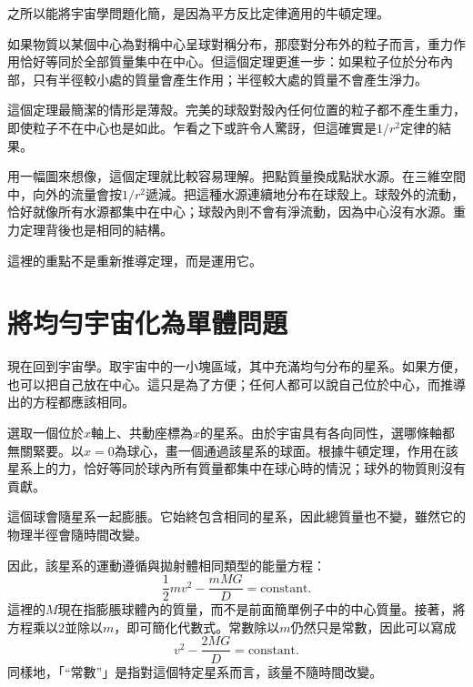 之所以能將宇宙學問題化簡，是因為平方反比定律適用的牛頓定理。

如果物質以某個中心為對稱中心呈球對稱分布，那麼對分布外的粒子而言，重力作用恰好等同於全部質量集中在中心。但這個定理更進一步：如果粒子位於分布內部，只有半徑較小處的質量會產生作用；半徑較大處的質量不會產生淨力。

這個定理最簡潔的情形是薄殼。完美的球殼對殼內任何位置的粒子都不產生重力，即使粒子不在中心也是如此。乍看之下或許令人驚訝，但這確實是\(1/r^2\)定律的結果。

\begin{classroomqa}
\end{classroomqa}

用一幅圖來想像，這個定理就比較容易理解。把點質量換成點狀水源。在三維空間中，向外的流量會按\(1/r^2\)遞減。把這種水源連續地分布在球殼上。球殼外的流動，恰好就像所有水源都集中在中心；球殼內則不會有淨流動，因為中心沒有水源。重力定理背後也是相同的結構。

這裡的重點不是重新推導定理，而是運用它。

\section{將均勻宇宙化為單體問題}

現在回到宇宙學。取宇宙中的一小塊區域，其中充滿均勻分布的星系。如果方便，也可以把自己放在中心。這只是為了方便；任何人都可以說自己位於中心，而推導出的方程都應該相同。

選取一個位於\(x\)軸上、共動座標為\(x\)的星系。由於宇宙具有各向同性，選哪條軸都無關緊要。以\(x=0\)為球心，畫一個通過該星系的球面。根據牛頓定理，作用在該星系上的力，恰好等同於球內所有質量都集中在球心時的情況；球外的物質則沒有貢獻。

這個球會隨星系一起膨脹。它始終包含相同的星系，因此總質量也不變，雖然它的物理半徑會隨時間改變。

因此，該星系的運動遵循與拋射體相同類型的能量方程：
\begin{equation}
\frac{1}{2}mv^2-\frac{mMG}{D}=\text{constant}.
\end{equation}
這裡的\(M\)現在指膨脹球體內的質量，而不是前面簡單例子中的中心質量。接著，將方程乘以\(2\)並除以\(m\)，即可簡化代數式。常數除以\(m\)仍然只是常數，因此可以寫成
\begin{equation}
v^2-\frac{2MG}{D}=\text{constant}.
\end{equation}
同樣地，「``常數''」是指對這個特定星系而言，該量不隨時間改變。

